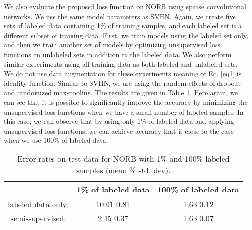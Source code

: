 \documentclass{article}
\begin{document}
We also evaluate the proposed loss function on NORB using sparse convolutional networks. We use the same model parameters as SVHN. Again, we create five sets of labeled data containing 1\% of training samples, and each labeled set is a different subset of training data. First, we train models using the labeled set only, and then we train another set of models by optimizing unsupervised loss functions on unlabeled sets in addition to the labeled data. We also perform similar experiments using all training data as both labeled and unlabeled sets. We do not use data augmentation for these experiments meaning  of Eq. \ref{eq1} is identity function. Similar to SVHN, we are using the random effects of dropout and randomized max-pooling. The results are given in Table \ref{tab4}. Here again, we can see that it is possible to significantly improve the accuracy by minimizing the unsupervised loss functions when we have a small number of labeled samples. In this case, we can observe that by using only 1\% of labeled data and applying unsupervised loss functions, we can achieve accuracy that is close to the case when we use 100\% of labeled data.
\begin{table}[h]
  \caption{Error rates on test data for NORB with 1\% and 100\% labeled samples (mean \%  std. dev).}
  \begin{center}
  \begin{tabular}{ c  c  c }
 \rule[-1.2ex]{0pt}{0ex}		         &  1\% of labeled data & 100\% of labeled data \\ \hline     
 \rule{0pt}{3ex}     labeled data only:  &  10.01  0.81 &  1.63  0.12   \\
                      semi-supervised:   &  2.15  0.37  &  1.63  0.07   \\              
  \end{tabular}  
  \end{center}
  \label{tab4}
\end{table}
\vspace{-0.5cm}
\end{document}
